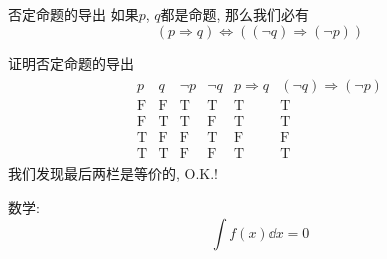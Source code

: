 \documentclass[zihao=-4,a4paper]{ctexart}
\begin{document}
\begin{mtheorem}{否定命题的导出}
		如果$p$, $q$都是命题, 那么我们必有
		\begin{equation}
			(p \Rightarrow q) \Leftrightarrow ((\neg q)\Rightarrow(\neg p))
		\end{equation}
\end{mtheorem}
\begin{mproof}{证明否定命题的导出}
	\begin{align}
\begin{array}{c|c||c|c|c|c}
p & q & \neg p & \neg q & p \Rightarrow q & (\neg q) \Rightarrow(\neg p) \\
\hline \mathrm{F} & \mathrm{F} & \mathrm{T} & \mathrm{T} & \mathrm{T} & \mathrm{T} \\
\mathrm{F} & \mathrm{T} & \mathrm{T} & \mathrm{F} & \mathrm{T} & \mathrm{T} \\
\mathrm{T} & \mathrm{F} & \mathrm{F} & \mathrm{T} & \mathrm{F} & \mathrm{F} \\
\mathrm{T} & \mathrm{T} & \mathrm{F} & \mathrm{F} & \mathrm{T} & \mathrm{T}
\end{array}
\end{align}
我们发现最后两栏是等价的, O.K.!
\end{mproof}
数学:
\begin{equation}
	\int f(x) \dd{x} = 0
\end{equation}


\end{document}
